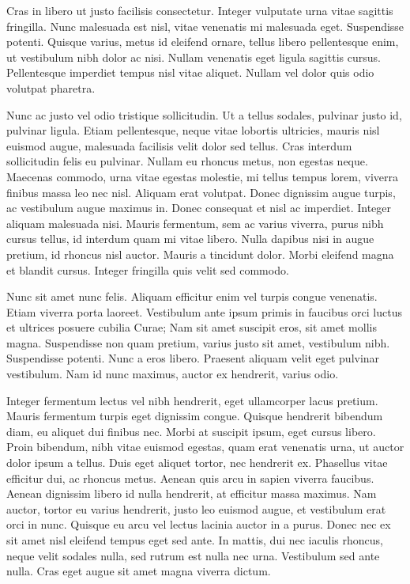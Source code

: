 \documentclass{article}
\begin{document}
	Cras in libero ut justo facilisis consectetur. Integer vulputate urna vitae sagittis fringilla. Nunc malesuada est nisl, vitae venenatis mi malesuada eget. Suspendisse potenti. Quisque varius, metus id eleifend ornare, tellus libero pellentesque enim, ut vestibulum nibh dolor ac nisi. Nullam venenatis eget ligula sagittis cursus. Pellentesque imperdiet tempus nisl vitae aliquet. Nullam vel dolor quis odio volutpat pharetra.
	
	Nunc ac justo vel odio tristique sollicitudin. Ut a tellus sodales, pulvinar justo id, pulvinar ligula. Etiam pellentesque, neque vitae lobortis ultricies, mauris nisl euismod augue, malesuada facilisis velit dolor sed tellus. Cras interdum sollicitudin felis eu pulvinar. Nullam eu rhoncus metus, non egestas neque. Maecenas commodo, urna vitae egestas molestie, mi tellus tempus lorem, viverra finibus massa leo nec nisl. Aliquam erat volutpat. Donec dignissim augue turpis, ac vestibulum augue maximus in. Donec consequat et nisl ac imperdiet. Integer aliquam malesuada nisi. Mauris fermentum, sem ac varius viverra, purus nibh cursus tellus, id interdum quam mi vitae libero. Nulla dapibus nisi in augue pretium, id rhoncus nisl auctor. Mauris a tincidunt dolor. Morbi eleifend magna et blandit cursus. Integer fringilla quis velit sed commodo.
	
	Nunc sit amet nunc felis. Aliquam efficitur enim vel turpis congue venenatis. Etiam viverra porta laoreet. Vestibulum ante ipsum primis in faucibus orci luctus et ultrices posuere cubilia Curae; Nam sit amet suscipit eros, sit amet mollis magna. Suspendisse non quam pretium, varius justo sit amet, vestibulum nibh. Suspendisse potenti. Nunc a eros libero. Praesent aliquam velit eget pulvinar vestibulum. Nam id nunc maximus, auctor ex hendrerit, varius odio.
	
	Integer fermentum lectus vel nibh hendrerit, eget ullamcorper lacus pretium. Mauris fermentum turpis eget dignissim congue. Quisque hendrerit bibendum diam, eu aliquet dui finibus nec. Morbi at suscipit ipsum, eget cursus libero. Proin bibendum, nibh vitae euismod egestas, quam erat venenatis urna, ut auctor dolor ipsum a tellus. Duis eget aliquet tortor, nec hendrerit ex. Phasellus vitae efficitur dui, ac rhoncus metus. Aenean quis arcu in sapien viverra faucibus. Aenean dignissim libero id nulla hendrerit, at efficitur massa maximus. Nam auctor, tortor eu varius hendrerit, justo leo euismod augue, et vestibulum erat orci in nunc. Quisque eu arcu vel lectus lacinia auctor in a purus. Donec nec ex sit amet nisl eleifend tempus eget sed ante. In mattis, dui nec iaculis rhoncus, neque velit sodales nulla, sed rutrum est nulla nec urna. Vestibulum sed ante nulla. Cras eget augue sit amet magna viverra dictum.
	
\end{document}
